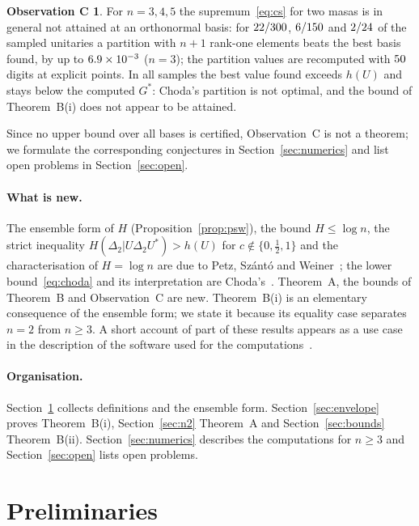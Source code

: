 \documentclass[11pt]{article}
\theoremstyle{plain}
\theoremstyle{definition}
\newtheorem*{obsC}{Observation C}
\theoremstyle{remark}
\begin{document}
\begin{obsC}
For $n=3,4,5$ the supremum~\eqref{eq:cs} for two masas is in general not attained at an orthonormal basis: for
$22/300$, $6/150$ and $2/24$ of the sampled unitaries a partition
with $n+1$ rank-one elements beats the best basis found, by up to $6.9\times10^{-3}$ ($n=3$); the partition values are
recomputed with $50$ digits at explicit points. In all samples the best value found exceeds $h(U)$ and stays below
the computed $G^*$: Choda's partition is not optimal, and the bound of Theorem~B(i) does not appear to be attained.
\end{obsC}

Since no upper bound over all bases is certified, Observation~C is not a theorem; we formulate the corresponding
conjectures in Section~\ref{sec:numerics} and list open problems in Section~\ref{sec:open}.

\paragraph{What is new.} The ensemble form of $H$ (Proposition~\ref{prop:psw}), the bound $H\le\log n$, the strict
inequality $H(\Delta_2|U\Delta_2U^*)>h(U)$ for $c\notin\{0,\frac12,1\}$ and the characterisation of $H=\log n$ are due to
Petz, Sz\'ant\'o and Weiner~\cite{petz2009}; the lower bound~\eqref{eq:choda} and its interpretation are Choda's~\cite{choda}.
Theorem~A, the bounds of Theorem~B and Observation~C are new. Theorem~B(i) is an elementary consequence of the ensemble form;
we state it because its equality case separates $n=2$ from $n\ge3$. A short account of part of these results appears as a
use case in the description of the software used for the computations~\cite{lib}.

\paragraph{Organisation.} Section~\ref{sec:prelim} collects definitions and the ensemble form.
Section~\ref{sec:envelope} proves Theorem~B(i), Section~\ref{sec:n2} Theorem~A and Section~\ref{sec:bounds}
Theorem~B(ii). Section~\ref{sec:numerics} describes the computations for $n\ge3$ and Section~\ref{sec:open} lists open problems.

\section{Preliminaries}\label{sec:prelim}
\end{document}
